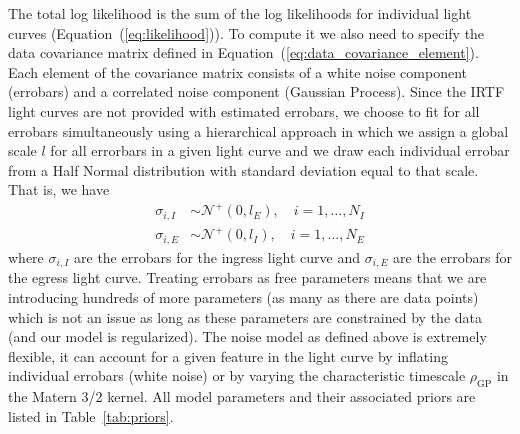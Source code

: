 \documentclass[modern]{aastex62}
\begin{document}
The total log likelihood is the sum of the log likelihoods for individual light curves (Equation~(\ref{eq:likelihood})). 
To compute it we also need to specify the data covariance matrix defined in Equation~(\ref{eq:data_covariance_element}).
Each element of the covariance matrix consists of a white noise component (errobars) and a correlated noise component (Gaussian Process).
Since the IRTF light curves are not provided with estimated errobars, we choose to fit for all errobars simultaneously using a hierarchical approach in which we assign a global scale $l$ for all errorbars in a given light curve and we draw each individual errobar from a Half Normal distribution with standard deviation equal to that scale.
That is, we have 
\begin{align}
    \sigma_{i,I}&\sim \mathcal{N}^+(0, l_E),\quad i=1,\dots,N_I\\
    \sigma_{i,E}&\sim \mathcal{N}^+(0,l_I),\quad i=1,\dots, N_E
\end{align}
where $\sigma_{i,I}$ are the errobars for the ingress light curve and $\sigma_{i,E}$ are the errobars for the egress light curve.
Treating errobars as free parameters means that we are introducing hundreds of more parameters (as many as there are data points) which is not an issue as long as these parameters are constrained by the data (and our model is regularized).
The noise model as defined above is extremely flexible, it can account for a given feature in the light curve by inflating individual errobars (white noise) or by varying the characteristic timescale $\rho_\mathrm{GP}$ in the Matern 3/2 kernel.
All model parameters and their associated priors are listed in Table~\ref{tab:priors}. 
\end{document}
